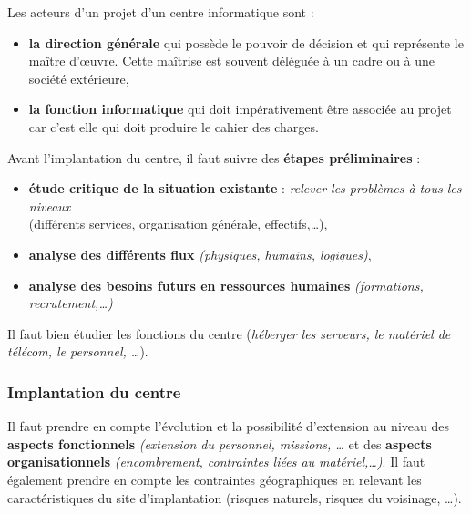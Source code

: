 \documentclass[10pt,a4paper,oneside,titlepage]{report}
\newcommand{\titre}[1]{\textcolor{title}{#1}}
\newcommand{\strong}[1]{\textbf{\titre{#1}}}
\begin{document}
\noindent Les acteurs d'un projet d'un centre informatique sont :
\begin{itemize}
\item \strong{la direction générale} qui possède le pouvoir de décision et qui
représente le maître d'\oe uvre. Cette maîtrise est souvent déléguée à un cadre
ou à une société extérieure,
\item \strong{la fonction informatique} qui doit impérativement \^etre associée
au projet car c'est elle qui doit produire le cahier des charges. \\
\end{itemize}

\noindent Avant l'implantation du centre, il faut suivre des \strong{étapes
préliminaires} :
\begin{itemize}
\item \strong{étude critique de la situation existante} : \textit{relever les
problèmes à tous les niveaux}\\(différents services, organisation générale,
effectifs,\dots),
\item \strong{analyse des différents flux} \textit{(physiques, humains,
logiques)},
\item \strong{analyse des besoins futurs en ressources humaines}
\textit{(formations, recrutement,\dots)}
\end{itemize}

Il faut bien étudier les fonctions du centre (\textit{héberger les serveurs, le
matériel de télécom, le personnel, \dots}).

\subsubsection{Implantation du centre}

Il faut prendre en compte l'évolution et la possibilité d'extension au niveau
des \strong{aspects fonctionnels} \textit{(extension du personnel, missions,
\dots} et des \strong{aspects organisationnels} \textit{(encombrement, contraintes
liées au matériel,\dots)}. Il faut également prendre en compte les contraintes
géographiques en relevant les caractéristiques du site d'implantation (risques
naturels, risques du voisinage, \dots). \\
\end{document}
